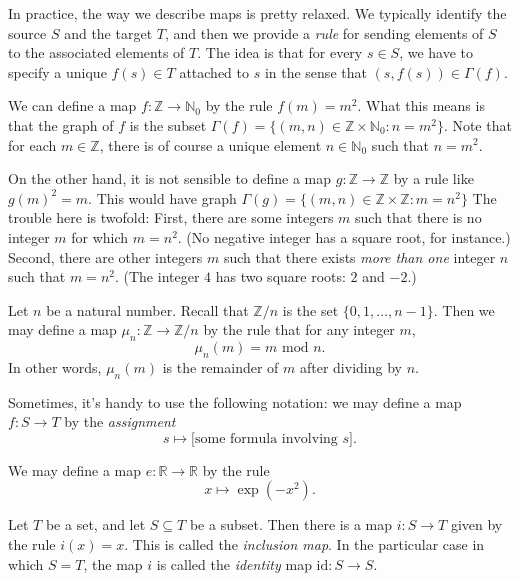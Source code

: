 \documentclass[11pt,dvipsnames]{book}
\def\Z{\mathbb{Z}}
\numberwithin{equation}{section} %
\numberwithin{figure}{section} %
\numberwithin{table}{section} %
\begin{document}
In practice, the way we describe maps is pretty relaxed.
We typically identify the source $S$ and the target $T$, and
then we provide a \emph{rule} for sending elements of $S$ to the associated elements of $T$.
The idea is that for every $ s \in S$, we have to specify a unique $f(s) \in T$ attached to $s$ in the sense that $(s, f(s)) \in \Gamma(f)$.

\begin{example}
We can define a map $f \colon \mathbb{Z}\rightarrow \mathbb{N}_0$ by the rule $f(m)=m^2$.
What this means is that the graph of $f$ is the subset $\Gamma(f) = \{(m,n) \in \mathbb{Z}\times\mathbb{N}_0 : n = m^2\}$.
Note that for each $m \in \mathbb{Z}$, there is of course a unique element $n \in \mathbb{N}_0$ such that $n=m^2$.

On the other hand, it is not sensible to define a map $ g \colon \mathbb{Z} \to \mathbb{Z}$ by a rule like $g(m)^2 = m$.
This would have graph $\Gamma(g) = \{(m,n) \in \mathbb{Z}\times\mathbb{Z} : m = n^2\}$
The trouble here is twofold:
First, there are some integers $m$ such that there is no integer $m$ for which $m = n^2$. (No negative integer has a square root, for instance.)
Second, there are other integers $m$ such that there exists \emph{more than one} integer $n$ such that $m = n^2$. (The integer $4$ has two square roots: $2$ and $-2$.)
\end{example}

\begin{example}
Let $n$ be a natural number.
Recall that $\Z/n$ is the set $\{0,1,\dots,n-1\}$.
Then we may define a map $\mu_n \colon \Z \to \Z/n$ by the rule that for any integer $m$,
\[
\mu_n(m) = m\mbox{ mod }n.\]
In other words, $\mu_n(m)$ is the remainder of $m$ after dividing by $n$.
\end{example}

Sometimes, it's handy to use the following notation:
we may define a map $ f \colon S \to T $ by the \emph{assignment}
\[
	s \mapsto \text{[some formula involving $s$].}
\]

\begin{example}
We may define a map $ e \colon \mathbb{R} \to \mathbb{R}$ by the rule
\[
x \mapsto \exp(-x^2).
\]
\end{example}

\begin{example}
Let $T$ be a set, and let $S \subseteq T$ be a subset.
Then there is a map $i \colon S \to T$ given by the rule $i(x)=x$.
This is called the \emph{inclusion map}.
In the particular case in which $S=T$, the map $i$ is called the \emph{identity} map $\mathrm{id} \colon S \to S$.
\end{example}
\end{document}
